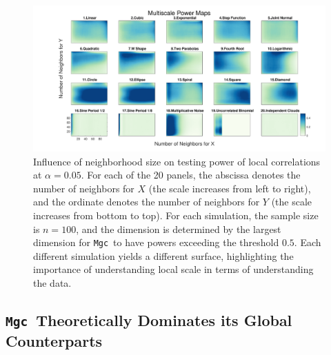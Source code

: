 \documentclass[11pt]{article}
\providecommand{\sct}[1]{{\sc \texttt{#1}}}
\newcommand{\Mgc}{\sct{Mgc}}
\begin{document}
\begin{figure}[htbp]
\includegraphics[width=1.0\textwidth]{../Figures/FigHDHeat}
\caption{Influence of neighborhood size on testing power of local correlations at $\alpha=0.05$.
For each of the 20 panels, the abscissa denotes the number of neighbors for $X$ (the scale increases from left to right), and the ordinate denotes the number of neighbors for $Y$ (the scale increases from bottom to top). For each simulation, the sample size is $n=100$, and the dimension is determined by the largest dimension for \Mgc~to have powers exceeding the threshold $0.5$. Each different simulation yields a different surface, highlighting the importance of understanding local scale in terms of understanding the data. }
\label{f:powermaps}
\end{figure}


\subsection*{\Mgc~Theoretically Dominates its Global Counterparts}
\label{s:theory}
\end{document}
